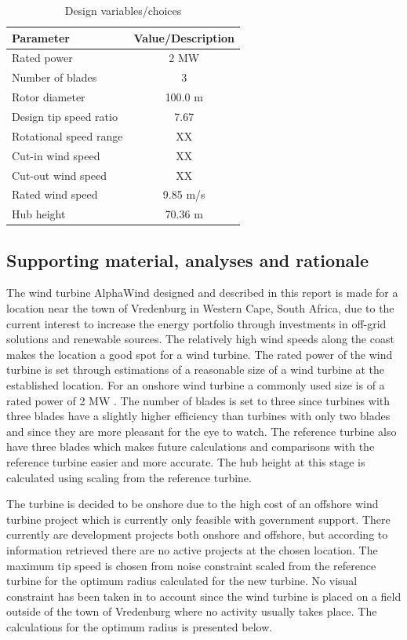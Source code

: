 \begin{table}[H]
\begin{center} 
\caption{Design variables/choices}\label{tab:systdesign2}
\begin{tabular}{ |l|c| } 
\hline
\textbf{Parameter} & \textbf{Value/Description}  \\ 
\hline
Rated power & 2 MW  \\ 
\hline
Number of blades & 3 \\ 
\hline
Rotor diameter & 100.0 m \\
\hline
Design tip speed ratio & 7.67 \\
\hline
Rotational speed range & XX \\
\hline
Cut-in wind speed & XX \\
\hline
Cut-out wind speed & XX \\
\hline
Rated wind speed & 9.85 m/s\\
\hline
Hub height & 70.36 m\\
\hline
\end{tabular}
\end{center}
\end{table}

\subsection{Supporting material, analyses and rationale}

The wind turbine AlphaWind designed and described in this report is made for a location near the town of Vredenburg in Western Cape, South Africa, due to the current interest to increase the energy portfolio through investments in off-grid solutions and renewable sources. The relatively high wind speeds along the coast makes the location a good spot for a wind turbine. The rated power of the wind turbine is set through estimations of a reasonable size of a wind turbine at the established location. For an onshore wind turbine a commonly used size is of a rated power of 2 MW \cite{southafrica}. The number of blades is set to three since turbines with three blades have a slightly higher efficiency than turbines with only two blades and since they are more pleasant for the eye to watch. The reference turbine also have three blades which makes future calculations and comparisons with the reference turbine easier and more accurate. The hub height at this stage is calculated using scaling from the reference turbine.

The turbine is decided to be onshore due to the high cost of an offshore wind turbine project which is currently only feasible with government support. There currently are development projects both onshore and offshore, but according to information retrieved there are no active projects at the chosen location. The maximum tip speed is chosen from noise constraint scaled from the reference turbine for the optimum radius calculated for the new turbine. No visual constraint has been taken in to account since the wind turbine is placed on a field outside of the town of Vredenburg where no activity usually takes place. The calculations for the optimum radius is presented below.

